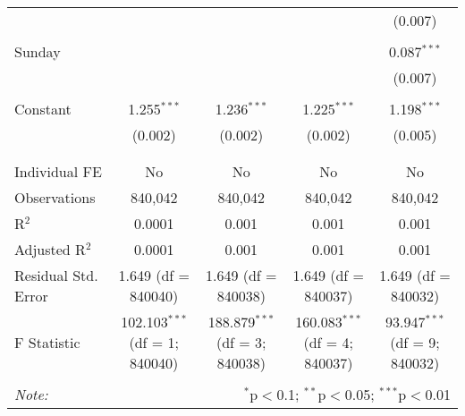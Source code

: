 \documentclass[
]{article}
\begin{document}
\begin{table}[!htbp]
{\begin{tabular}{@{\extracolsep{5pt}}lcccc}
  &  &  &  & (0.007) \\ 
  & & & & \\ 
 Sunday &  &  &  & 0.087$^{***}$ \\ 
  &  &  &  & (0.007) \\ 
  & & & & \\ 
 Constant & 1.255$^{***}$ & 1.236$^{***}$ & 1.225$^{***}$ & 1.198$^{***}$ \\ 
  & (0.002) & (0.002) & (0.002) & (0.005) \\ 
  & & & & \\ 
\hline \\[-1.8ex] 
Individual FE & No & No & No & No \\ 
Observations & 840,042 & 840,042 & 840,042 & 840,042 \\ 
R$^{2}$ & 0.0001 & 0.001 & 0.001 & 0.001 \\ 
Adjusted R$^{2}$ & 0.0001 & 0.001 & 0.001 & 0.001 \\ 
Residual Std. Error & 1.649 (df = 840040) & 1.649 (df = 840038) & 1.649 (df = 840037) & 1.649 (df = 840032) \\ 
F Statistic & 102.103$^{***}$ (df = 1; 840040) & 188.879$^{***}$ (df = 3; 840038) & 160.083$^{***}$ (df = 4; 840037) & 93.947$^{***}$ (df = 9; 840032) \\ 
\hline 
\hline \\[-1.8ex] 
\textit{Note:}  & \multicolumn{4}{r}{$^{*}$p$<$0.1; $^{**}$p$<$0.05; $^{***}$p$<$0.01} \\ 
\end{tabular}
} 
\end{table} 
\newpage
\end{document}
